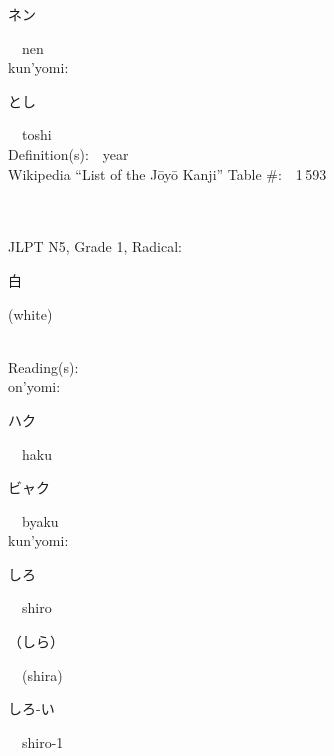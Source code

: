 \begin{multicols}{2}
{\hspace*{2em}}{\begin{CJK}{UTF8}{min} ネン \end{CJK}}\ \ nen\ \ \\
{\hspace*{1em}}kun'yomi:\ \ \\
{\hspace*{2em}}{\begin{CJK}{UTF8}{min} とし \end{CJK}}\ \ toshi\ \ \\
Definition(s):\ \ year \\
Wikipedia ``List of the J\=oy\=o Kanji'' Table \#:\ \ 1\,593 \\
\ \ \\
{\fontsize{34pt}{40pt}  }\ \ \\  %
{JLPT N5, Grade 1, Radical:\ \ {\begin{CJK}{UTF8}{min} 白 \end{CJK}} (white) } \\
Reading(s):\ \ \\
{\hspace*{1em}}on'yomi:\ \ \\
{\hspace*{2em}}{\begin{CJK}{UTF8}{min} ハク \end{CJK}}\ \ haku\ \ \\
{\hspace*{2em}}{\begin{CJK}{UTF8}{min} ビャク \end{CJK}}\ \ byaku\ \ \\
{\hspace*{1em}}kun'yomi:\ \ \\
{\hspace*{2em}}{\begin{CJK}{UTF8}{min} しろ \end{CJK}}\ \ shiro\ \ \\
{\hspace*{2em}}{\begin{CJK}{UTF8}{min} （しら） \end{CJK}}\ \ (shira)\ \ \\
{\hspace*{2em}}{\begin{CJK}{UTF8}{min} しろ-い \end{CJK}}\ \ shiro-1\ \ \\

\end{multicols}
